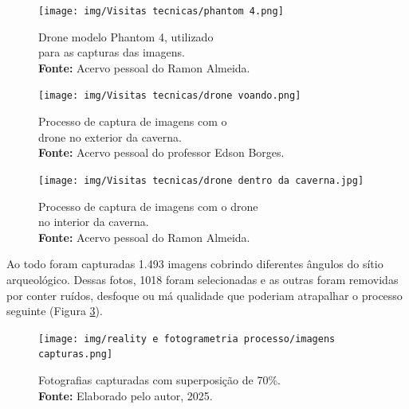 \begin{figure}[H]
    \centering
    \begin{minipage}{0.45\textwidth} 
        \centering
    \texttt{[image: img/Visitas tecnicas/phantom 4.png]}
    \caption{ Drone modelo Phantom 4, utilizado \\ para as capturas das imagens.\\
        \textbf{Fonte:} Acervo pessoal do Ramon Almeida.}
    \label{fig:phantom 4}   
    \end{minipage}
    \hspace{1cm} 
    \begin{minipage}{0.45\textwidth}
        \centering
        \texttt{[image: img/Visitas tecnicas/drone voando.png]}
        \caption{Processo de captura de imagens com o \\ drone no exterior da caverna.\\
            \textbf{Fonte:} Acervo pessoal do professor Edson Borges.}
        \label{fig:drone voando}
    \end{minipage}
\end{figure}

\begin{figure}[H]
    \centering
        \texttt{[image: img/Visitas tecnicas/drone dentro da caverna.jpg]}
        \caption{Processo de captura de imagens com o drone \\
        no interior da caverna. \\
            \textbf{Fonte:} Acervo pessoal do Ramon Almeida.}
        \label{fig:drone dentro da caverna}
\end{figure}

 Ao todo foram capturadas 1.493 imagens cobrindo diferentes ângulos do sítio arqueológico. Dessas fotos, 1018 foram selecionadas e as outras foram removidas por conter ruídos, desfoque ou má qualidade que poderiam atrapalhar o processo seguinte (Figura \ref{fig:fotos tiradas}).

\begin{figure}[H]
    \centering
    \texttt{[image: img/reality e fotogrametria processo/imagens capturas.png]}
    \caption{Fotografias capturadas com superposição de 70\%.\\
        \textbf{Fonte:} Elaborado pelo autor, 2025.}
    \label{fig:fotos tiradas}   
\end{figure}

